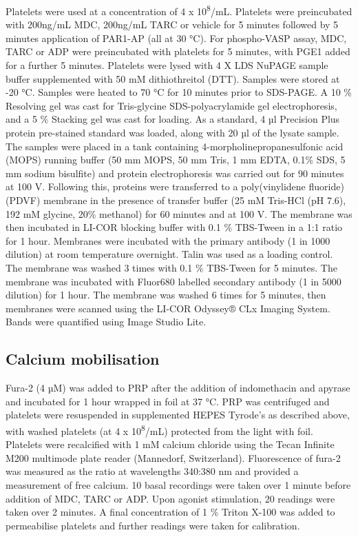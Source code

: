 \documentclass[11pt,twoside]{bristolthesis}
\begin{document}
Platelets were used at a concentration of 4 x 10\textsuperscript{8}/mL. Platelets were preincubated with 200ng/mL MDC, 200ng/mL TARC or vehicle for 5 minutes followed by 5 minutes application of PAR1-AP (all at 30 °C). For phospho-VASP assay, MDC, TARC or ADP were preincubated with platelets for 5 minutes, with PGE1 added for a further 5 minutes. Platelets were lysed with 4 X LDS NuPAGE sample buffer supplemented with 50 mM dithiothreitol (DTT). Samples were stored at -20 °C. Samples were heated to 70 °C for 10 minutes prior to SDS-PAGE. A 10 \% Resolving gel was cast for Tris-glycine SDS-polyacrylamide gel electrophoresis, and a 5 \% Stacking gel was cast for loading. As a standard, 4 µl Precision Plus protein pre-stained standard was loaded, along with 20 µl of the lysate sample. The samples were placed in a tank containing 4-morpholinepropanesulfonic acid (MOPS) running buffer (50 mm MOPS, 50 mm Tris, 1 mm EDTA, 0.1\% SDS, 5 mm sodium bisulfite) and protein electrophoresis was carried out for 90 minutes at 100 V. Following this, proteins were transferred to a poly(vinylidene fluoride) (PDVF) membrane in the presence of transfer buffer (25 mM Tris-HCl (pH 7.6), 192 mM glycine, 20\% methanol) for 60 minutes and at 100 V. The membrane was then incubated in LI-COR blocking buffer with 0.1 \% TBS-Tween in a 1:1 ratio for 1 hour. Membranes were incubated with the primary antibody (1 in 1000 dilution) at room temperature overnight. Talin was used as a loading control. The membrane was washed 3 times with 0.1 \% TBS-Tween for 5 minutes. The membrane was incubated with Fluor680 labelled secondary antibody (1 in 5000 dilution) for 1 hour. The membrane was washed 6 times for 5 minutes, then membranes were scanned using the LI-COR Odyssey® CLx Imaging System. Bands were quantified using Image Studio Lite.

\hypertarget{calcium-mobilisation}{%
\subsection{Calcium mobilisation}\label{calcium-mobilisation}}

Fura-2 (4 µM) was added to PRP after the addition of indomethacin and apyrase and incubated for 1 hour wrapped in foil at 37 °C. PRP was centrifuged and platelets were resuspended in supplemented HEPES Tyrode's as described above, with washed platelets (at 4 x 10\textsuperscript{8}/mL) protected from the light with foil. Platelets were recalcified with 1 mM calcium chloride using the Tecan Infinite M200 multimode plate reader (Mannedorf, Switzerland). Fluorescence of fura-2 was measured as the ratio at wavelengths 340:380 nm and provided a measurement of free calcium. 10 basal recordings were taken over 1 minute before addition of MDC, TARC or ADP. Upon agonist stimulation, 20 readings were taken over 2 minutes. A final concentration of 1 \% Triton X-100 was added to permeabilise platelets and further readings were taken for calibration.
\end{document}
